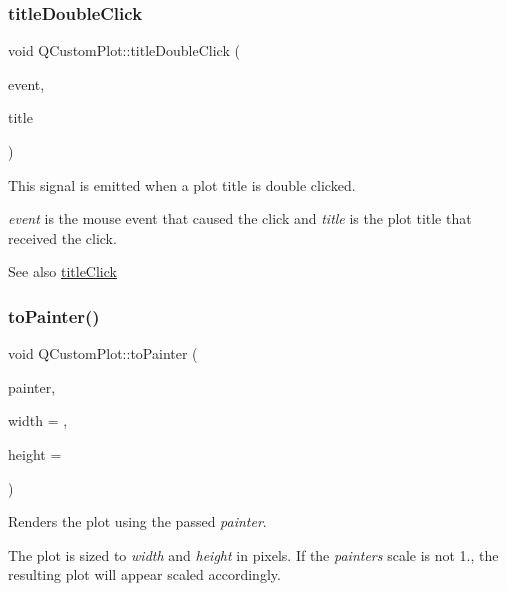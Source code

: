 \subsubsection{\texorpdfstring{title\+Double\+Click}{titleDoubleClick}}
{\footnotesize\ttfamily void Q\+Custom\+Plot\+::title\+Double\+Click (\begin{DoxyParamCaption}\item[{Q\+Mouse\+Event $\ast$}]{event,  }\item[{\hyperlink{class_q_c_p_plot_title}{Q\+C\+P\+Plot\+Title} $\ast$}]{title }\end{DoxyParamCaption})\hspace{0.3cm}{\ttfamily [signal]}}

This signal is emitted when a plot title is double clicked.

{\itshape event} is the mouse event that caused the click and {\itshape title} is the plot title that received the click.

\begin{DoxySeeAlso}{See also}
\hyperlink{class_q_custom_plot_a2137a819e518fee7edd1c0bf5984d8d6}{title\+Click} 
\end{DoxySeeAlso}
\hypertarget{class_q_custom_plot_a1be68d5c0f1e086d6374d1340a193fb9}{}\label{class_q_custom_plot_a1be68d5c0f1e086d6374d1340a193fb9} 
\subsubsection{\texorpdfstring{to\+Painter()}{toPainter()}}
{\footnotesize\ttfamily void Q\+Custom\+Plot\+::to\+Painter (\begin{DoxyParamCaption}\item[{\hyperlink{class_q_c_p_painter}{Q\+C\+P\+Painter} $\ast$}]{painter,  }\item[{int}]{width = {},  }\item[{int}]{height = {} }\end{DoxyParamCaption})}

Renders the plot using the passed {\itshape painter}.

The plot is sized to {\itshape width} and {\itshape height} in pixels. If the {\itshape painter\textquotesingle{}s} scale is not 1., the resulting plot will appear scaled accordingly.

